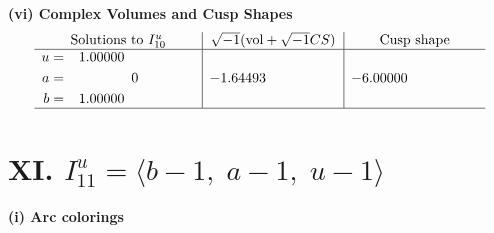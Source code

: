 \documentclass[1p]{elsarticle_modified}
\theoremstyle{definition}
\newcommand{\I}{\sqrt{-1}}
\begin{document}
\newpage\flushleft \textbf{(vi) Complex Volumes and Cusp Shapes}
$$\begin{array}{c|c|c}  
\text{Solutions to }I^u_{10}& \I (\text{vol} + \sqrt{-1}CS) & \text{Cusp shape}\\
 \hline 
\begin{aligned}
u &= \phantom{-}1.00000\phantom{ +0.000000I} \\
a &= \phantom{-0.000000 } 0 \\
b &= \phantom{-}1.00000\phantom{ +0.000000I}\end{aligned}
 & -1.64493\phantom{ +0.000000I} & -6.00000\phantom{ +0.000000I}\\
 \hline 
 \end{array}$$\newpage\newpage\renewcommand{\arraystretch}{1}
\centering \section*{XI. $I^u_{11}= \langle b-1,\;a-1,\;u-1 \rangle$}
\flushleft \textbf{(i) Arc colorings}\\
\end{document}
